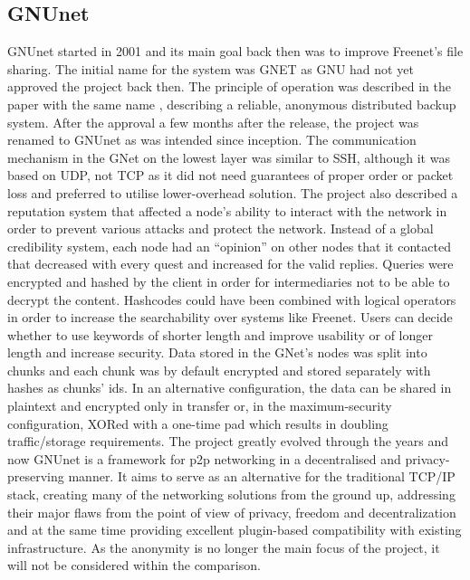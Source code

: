 \subsection{GNUnet}
GNUnet started in 2001 and its main goal back then was to improve Freenet’s file sharing. The initial name for the system was GNET as GNU had not yet approved the project back then. The principle of operation was described in the paper with the same name \cite{gnet}, describing a reliable, anonymous distributed backup system. After the approval a few months after the release, the project was renamed to GNUnet as was intended since inception. The communication mechanism in the GNet on the lowest layer was similar to SSH, although it was based on UDP, not TCP as it did not need guarantees of proper order or packet loss and preferred to utilise lower-overhead solution. The project also described a reputation system that affected a node’s ability to interact with the network in order to prevent various attacks and protect the network. Instead of a global credibility system, each node had an “opinion” on other nodes that it contacted that decreased with every quest and increased for the valid replies. Queries were encrypted and hashed by the client in order for intermediaries not to be able to decrypt the content. Hashcodes could have been combined with logical operators in order to increase the searchability over systems like Freenet. Users can decide whether to use keywords of shorter length and improve usability or of longer length and increase security. Data stored in the GNet’s nodes was split into chunks and each chunk was by default encrypted and stored separately with hashes as chunks’ ids. In an alternative configuration, the data can be shared in plaintext and encrypted only in transfer or, in the maximum-security configuration, XORed with a one-time pad which results in doubling traffic/storage requirements.
The project greatly evolved through the years and now GNUnet is a framework for p2p networking in a decentralised and privacy-preserving manner. It aims to serve as an alternative for the traditional TCP/IP stack, creating many of the networking solutions from the ground up, addressing their major flaws from the point of view of privacy, freedom and decentralization and at the same time providing excellent plugin-based compatibility with existing infrastructure. As the anonymity is no longer the main focus of the project, it will not be considered within the comparison.


